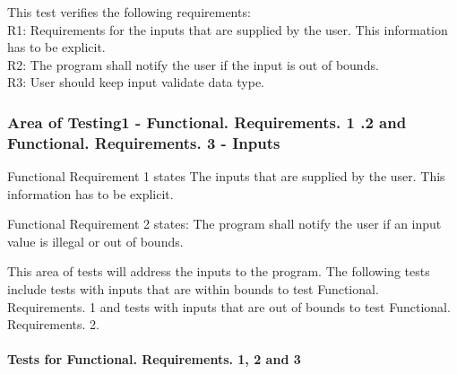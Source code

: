 \documentclass[12pt, titlepage]{article}
\begin{document}
This test verifies the following requirements: \\
\indent  R1: Requirements for the inputs that are supplied by the user. This information has to be
explicit.\\
\indent  R2: The program shall notify the user if the input is out of bounds.\\
\indent R3: User should keep input validate data type.\\		
\subsubsection{Area of Testing1 - Functional. Requirements. 1 .2 and Functional. Requirements. 3 - Inputs}\label{test_input}

Functional Requirement 1 states The inputs that are supplied by the user. This information has to be
explicit.

Functional Requirement 2 states: The program shall notify the user if an input value is illegal or out of bounds.

This area of tests will address the inputs to the program. The following tests include  tests with inputs that are within bounds to test Functional. Requirements. 1 and tests with inputs that are out of bounds to test Functional. Requirements. 2.

\paragraph{Tests for Functional. Requirements. 1, 2 and 3}
\end{document}
